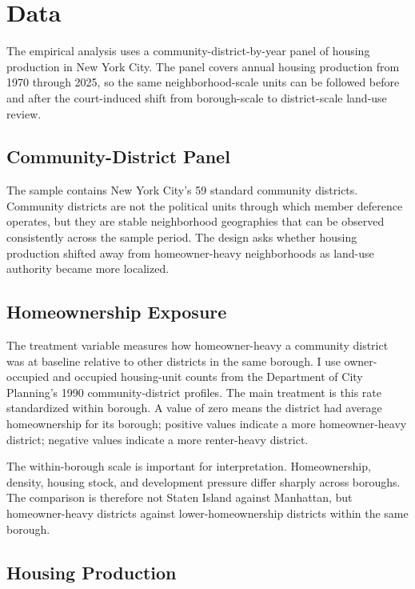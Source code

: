 \section{Data}
\label{sec:data}

The empirical analysis uses a community-district-by-year panel of housing production in New York City.
The panel covers annual housing production from 1970 through 2025, so the same neighborhood-scale units can be followed before and after the court-induced shift from borough-scale to district-scale land-use review.

\subsection{Community-District Panel}

The sample contains New York City's 59 standard community districts.
Community districts are not the political units through which member deference operates, but they are stable neighborhood geographies that can be observed consistently across the sample period.
The design asks whether housing production shifted away from homeowner-heavy neighborhoods as land-use authority became more localized.

\subsection{Homeownership Exposure}

The treatment variable measures how homeowner-heavy a community district was at baseline relative to other districts in the same borough.
I use owner-occupied and occupied housing-unit counts from the Department of City Planning's 1990 community-district profiles.
The main treatment is this rate standardized within borough.
A value of zero means the district had average homeownership for its borough; positive values indicate a more homeowner-heavy district; negative values indicate a more renter-heavy district.

The within-borough scale is important for interpretation.
Homeownership, density, housing stock, and development pressure differ sharply across boroughs.
The comparison is therefore not Staten Island against Manhattan, but homeowner-heavy districts against lower-homeownership districts within the same borough.

\subsection{Housing Production}

